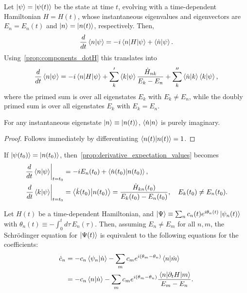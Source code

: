 \documentclass[12pt]{report}
\begin{document}
\begin{prop}
	Let $\ket\psi=\ket{\psi(t)}$ be the state at time $t$, evolving with a time-dependent Hamiltonian $H=H(t)$, whose instantaneous eigenvalues and eigenvectors are $E_n=E_n(t)$ and $\ket n=\ket{n(t)}$, respectively.
	Then,
	\begin{equation}
		\frac{d}{dt}\braket{n}{\psi} = -i\mel{n}{H}{\psi} + \braket{\dot n}{\psi}.
	\end{equation}
	Using~\cref{prop:components_dotH} this translates into
	\begin{equation}
		\frac{d}{dt}\braket{n}{\psi} =
		- i \mel{n}{H}{\psi}
		+ \sum_k' \braket{k}{\psi} \frac{\dot H_{nk}}{E_k - E_n}
		+ \sum_k'' \braket{\dot n}{k}\braket{k}{\psi},
	\end{equation}
	where the primed sum is over all eigenstates $E_k$ with $E_k\neq E_n$, while the doubly primed sum is over all eigenstates $E_k$ with $E_k=E_n$.
	\label{prop:derivative_expectation_values}
\end{prop}

\begin{prop}
	For any instantaneous eigenstate $\ket n\equiv\ket{n(t)}$, $\braket{\dot n}{n}$ is purely imaginary.
	\label{prop:ndotn_is_purely_imag}
\end{prop}
\begin{proof}
	Follows immediately by differentiating $\braket{n(t)}{n(t)}=1$.
\end{proof}

\begin{prop}
	If $\ket{\psi(t_0)}=\ket{n(t_0)}$, then~\cref{prop:derivative_expectation_values} becomes
	\begin{align}
		\left. \frac{d}{dt}\braket{n}{\psi}\right\rvert_{t=t_0} &= 
		-i E_n(t_0) + \braket{\dot n(t_0)}{n(t_0)}, \\
		\left. \frac{d}{dt}\braket{k}{\psi}\right\rvert_{t=t_0} &= 
		\braket{\dot k(t_0)}{n(t_0)} = \frac{\dot H_{kn}(t_0)}{E_k(t_0)-E_n(t_0)},\quad E_k(t_0)\neq E_n(t_0).
	\end{align}
\end{prop}

\begin{prop}
	Let $H(t)$ be a time-dependent Hamiltonian, and
	$\ket{\Psi}\equiv \sum_n c_n(t)e^{i\theta_n(t)}\ket{\psi_n(t)}$ with
	$\theta_n(t)\equiv-\int_0^t d\tau\,E_n(\tau)$.
	Then, assuming $E_n\neq E_m$ for all $n,m$, the Schr\"{o}dinger equation for $\ket{\Psi(t)}$ is equivalent to the following equations for the coefficients:
	\begin{equation}
	\begin{aligned}
		\dot c_n &= -c_n \braket{\psi_n}{\dot n}
		- \sum_m c_m e^{i(\theta_m-\theta_n)} \braket{ n}{\dot m} \\
		&= -c_n \braket{ n}{\dot n}
		- \sum_m c_m e^{i(\theta_m-\theta_n)} \frac{\mel{n}{\partial_t H}{ m}}{E_m-E_n}.
	\end{aligned}
	\end{equation}
\end{prop}
\end{document}
